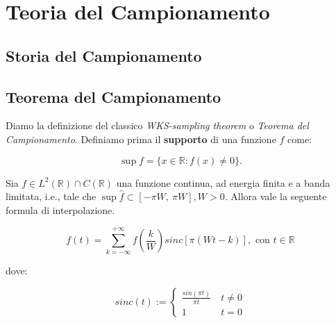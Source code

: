 \section{Teoria del Campionamento}

\subsection{Storia del Campionamento}

\subsection{Teorema del Campionamento}

Diamo la definizione del classico \textit{WKS-sampling theorem} o
\textit{Teorema del Campionamento}. Definiamo prima il \textbf{supporto}
di una funzione $f$ come:

$$
    \sup f = \{ x \in \mathbb{R} : f(x) \neq 0 \}.
$$

\begin{theorem}
    Sia $f \in L^2(\mathbb{R}) \cap C(\mathbb{R})$ una funzione continua, ad energia finita e
    a banda limitata, i.e., tale che
    $\sup \hat{f} \subset \left[ -\pi W, \ \pi W\right], W > 0$.
    Allora vale la seguente formula di interpolazione.

    $$
        f(t) = \sum_{k = - \infty}^{+\infty} f \left(\frac{k}{W}\right) sinc \left[ \pi(Wt - k) \right], \text{ con } t \in \mathbb{R}
    $$

    dove:

    $$
        sinc(t) :=
        \left\{ \begin{array}{cl}
            \frac{sin(\pi t)}{\pi t} & \ t \neq 0 \\
            1                        & \ t = 0
        \end{array} \right.
    $$
\end{theorem}


